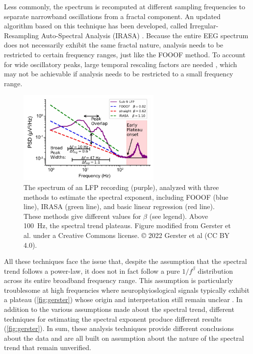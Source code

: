 Less commonly, the spectrum is recomputed at different sampling frequencies to separate narrowband oscillations from a fractal component. An updated algorithm based on this technique has been developed, called Irregular-Resampling Auto-Spectral Analysis (IRASA) \cite{Wen2016}. Because the entire EEG spectrum does not necessarily exhibit the same fractal nature, analysis needs to be restricted to certain frequency ranges, just like the FOOOF method. To account for wide oscillatory peaks, large temporal rescaling factors are needed \cite{Gerster2022}, which may not be achievable if analysis needs to be restricted to a small frequency range.

\begin{figure}
\vspace{-10pt}
\includegraphics[width=70mm]{Figures/chapter1/gerster.pdf}
\vspace{-5pt}
\caption{  The spectrum of an LFP recording (purple), analyzed with three methods to estimate the spectral exponent, including FOOOF (blue line), IRASA (green line), and basic linear regression (red line). These methods give different values for $\beta$ (see legend). Above \qty{100}{\hertz}, the spectral trend plateaus. Figure modified from Gerster et al. \cite{Gerster2022} under a Creative Commons license. © 2022 Gerster et al (CC BY 4.0).
} \label{fig:gerster}
\end{figure}

All these techniques face the issue that, despite the assumption that the spectral trend follows a power-law, it does not in fact follow a pure $1/f^\beta$ distribution across its entire broadband frequency range. This assumption is particularly troublesome at high frequencies where neurophyioslogical signals typically exhibit a plateau  (\autoref{fig:gerster}) whose origin and interpretation still remain unclear \cite{Gerster2022}. In addition to the various assumptions made about the spectral trend, different techniques for estimating the spectral exponent produce different results (\autoref{fig:gerster}). In sum, these analysis techniques provide different conclusions about the data and are all built on assumption about the nature of the spectral trend that remain unverified. 

